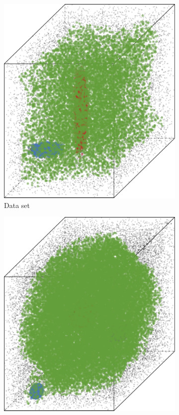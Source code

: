 \begin{figure}
\begin{subfigure}{0.23\textwidth}
				\includegraphics[keepaspectratio=true, width=\textwidth, height=0.23\textheight]{discussion/img/baakman_2_abs_error_mbeSmallerThansambe}
				\caption{Data set \baakmanTwo}
				\label{fig:discussion:performance:mbeLowerError:baakman2}
			\end{subfigure}
			\subfigvspace
			\begin{subfigure}{0.23\textwidth}
				\centering
				\includegraphics[keepaspectratio=true, width=\textwidth, height=0.23\textheight]{discussion/img/ferdosi_3_abs_error_mbeSmallerThansambe}

\end{subfigure}
\end{figure}
